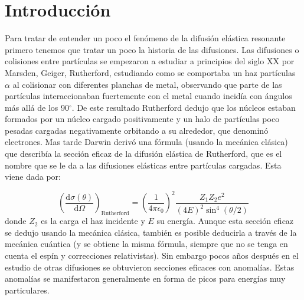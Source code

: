 \documentclass[fleqn,10pt]{SelfArx} %
\affiliation{\textsuperscript{1}\textit{Facultad de Física, Universidad Santiago de Compostela, Galicia, España}} %
\affiliation{*\textbf{Correo del autor}: danielvazquezlago@gmail.com, daniel.vazquez.lago@rai.usc.es} %
\newcommand{\parentesis}[1]{\left( #1  \right)}
\newcommand{\D}{\mathrm{d}}
\newcommand{\derivadas}[2]{\frac{\D #1}{\D #2}}
\begin{document}
\maketitle %

\tableofcontents %

\thispagestyle{empty} %


\setlength{\parskip}{1.5mm} %



\section{Introducción}

Para tratar de entender un poco el fenómeno de la difusión elástica resonante primero tenemos que tratar un poco la historia de las difusiones. Las difusiones o colisiones entre partículas se empezaron a estudiar a principios del siglo XX por Marsden, Geiger, Rutherford, estudiando como se comportaba un haz partículas $\alpha$ al colisionar con diferentes planchas de metal, observando que parte de las partículas interaccionaban fuertemente con el metal cuando incidía con ángulos más allá de los 90$^\circ$. De este resultado Rutherford dedujo que los núcleos estaban formados por un núcleo cargado positivamente y un halo de partículas poco pesadas cargadas negativamente orbitando a su alrededor, que denominó electrones. Mas tarde Darwin derivó una fórmula (usando la mecánica clásica) que describía la sección eficaz de la difusión elástica de Rutherford, que es el nombre que se le da a las difusiones elásticas entre partículas cargadas. Esta viene dada por:

\begin{equation}
	\parentesis{\derivadas{\sigma(\theta)}{\Omega}}_{\text{Rutherford}} = \parentesis{\frac{1}{ 4 \pi \epsilon_0}}^2 \frac{Z_1Z_2 e^2}{(4E)^2\sin^4 (\theta/2)}
\end{equation}
donde $Z_2$ es la carga el haz incidente y $E$ su energía. Aunque esta sección eficaz se dedujo usando la mecánica clásica, también es posible deducirla a través de la mecánica cuántica (y se obtiene la misma fórmula, siempre que no se tenga en cuenta el espín y correcciones relativistas). Sin embargo pocos años después en el estudio de otras difusiones se obtuvieron secciones eficaces con anomalías. Estas anomalías se manifestaron generalmente en forma de picos para energías muy particulares.
\end{document}
